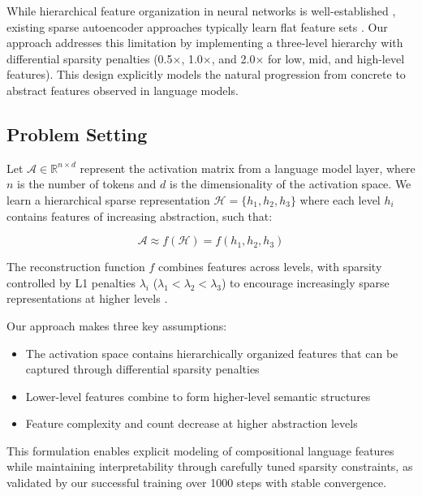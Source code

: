 While hierarchical feature organization in neural networks is well-established \cite{olah2020zoom}, existing sparse autoencoder approaches typically learn flat feature sets \cite{cammarata2020curve}. Our approach addresses this limitation by implementing a three-level hierarchy with differential sparsity penalties (0.5$\times$, 1.0$\times$, and 2.0$\times$ for low, mid, and high-level features). This design explicitly models the natural progression from concrete to abstract features observed in language models.

\subsection{Problem Setting}
Let $\mathcal{A} \in \mathbb{R}^{n \times d}$ represent the activation matrix from a language model layer, where $n$ is the number of tokens and $d$ is the dimensionality of the activation space. We learn a hierarchical sparse representation $\mathcal{H} = \{h_1, h_2, h_3\}$ where each level $h_i$ contains features of increasing abstraction, such that:

\begin{equation}
\mathcal{A} \approx f(\mathcal{H}) = f(h_1, h_2, h_3)
\end{equation}

The reconstruction function $f$ combines features across levels, with sparsity controlled by L1 penalties $\lambda_i$ ($\lambda_1 < \lambda_2 < \lambda_3$) to encourage increasingly sparse representations at higher levels \cite{Liu2020HierarchicalSC,Tomasini2024HowDN}.

Our approach makes three key assumptions:
\begin{itemize}
    \item The activation space contains hierarchically organized features that can be captured through differential sparsity penalties
    \item Lower-level features combine to form higher-level semantic structures
    \item Feature complexity and count decrease at higher abstraction levels
\end{itemize}

This formulation enables explicit modeling of compositional language features while maintaining interpretability through carefully tuned sparsity constraints, as validated by our successful training over 1000 steps with stable convergence.

